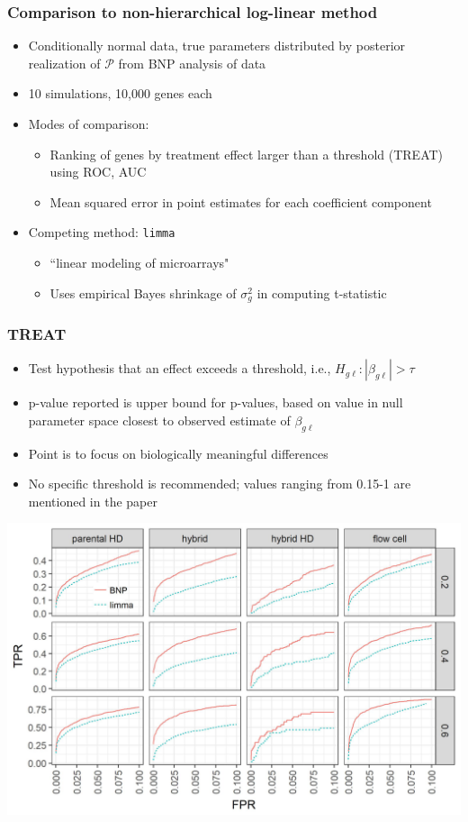 \documentclass{beamer}
\begin{document}
\begin{frame}
  \frametitle{Comparison to non-hierarchical log-linear method}
  \begin{itemize}
    \item Conditionally normal data, true parameters distributed by posterior realization of $\mathcal{P}$ from BNP analysis of \citet{paschold} data
    \item 10 simulations, 10,000 genes each
    \item Modes of comparison:
    \begin{itemize}
      \item Ranking of genes by treatment effect larger than a threshold (TREAT) using ROC, AUC
      \item Mean squared error in point estimates for each coefficient component
    \end{itemize}
    \item Competing method: \texttt{limma} \citep{mccarthy}
    \begin{itemize}
      \item ``linear modeling of microarrays"
      \item Uses empirical Bayes shrinkage of $\sigma^2_g$ in computing t-statistic
    \end{itemize}
  \end{itemize}
\end{frame}

\begin{frame}
  \frametitle{TREAT}
  \begin{itemize}
    \pause\item Test hypothesis that an effect exceeds a threshold, i.e., $H_{g\ell}: |\beta_{g \ell}|>\tau$
    \pause\item p-value reported is upper bound for p-values, based on value in null parameter space closest to observed estimate of $\beta_{g\ell}$
    \pause\item Point is to focus on biologically meaningful differences
    \pause\item No specific threshold is recommended; values ranging from 0.15-1 are mentioned in the paper
  \end{itemize}
  \citep{treat}
\end{frame}

\begin{frame}
\includegraphics[width=\textwidth]{ss1-roc}
\end{frame}
\end{document}
